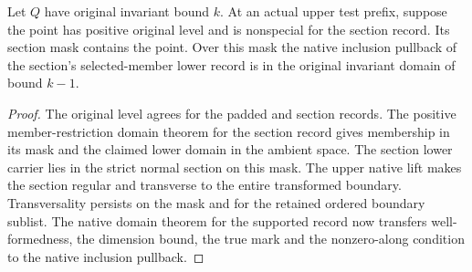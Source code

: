 \begin{theorem}
\label{hir:g1-positive-normal-native-domain-on-section-mask}
\leanok
Let $Q$ have original invariant bound $k$. At an actual upper test
prefix, suppose the point has positive original level and is nonspecial
for the section record. Its section mask contains the point. Over this
mask the native inclusion pullback of the section's selected-member
lower record is in the original invariant domain of bound $k-1$.
\end{theorem}
\begin{proof}
The original level agrees for the padded and section records. The
positive member-restriction domain theorem for the section record
gives membership in its mask and the claimed lower domain in the
ambient space. The section lower carrier lies in the strict normal
section on this mask. The upper native lift makes the section regular
and transverse to the entire transformed boundary. Transversality
persists on the mask and for the retained ordered boundary sublist.
The native domain theorem for the supported record now transfers
well-formedness, the dimension bound, the true mark and the
nonzero-along condition to the native inclusion pullback.
\end{proof}


